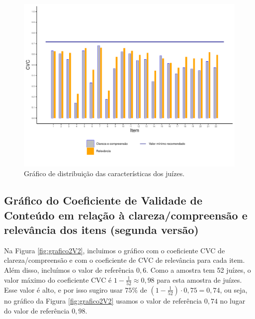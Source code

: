 \documentclass[
]{article}
\begin{document}
\begin{figure}[htbp]

{\centering \includegraphics[width=0.9\linewidth]{../figures/grafico2_0_8} 

}

\caption{Gráfico de distribuição das características dos juízes.}\label{fig:grafico2V1}
\end{figure}

\newpage

\hypertarget{gruxe1fico-do-coeficiente-de-validade-de-conteuxfado-em-relauxe7uxe3o-uxe0-clarezacompreensuxe3o-e-relevuxe2ncia-dos-itens-segunda-versuxe3o}{%
\subsection{Gráfico do Coeficiente de Validade de Conteúdo em relação à clareza/compreensão e relevância dos itens (segunda versão)}\label{gruxe1fico-do-coeficiente-de-validade-de-conteuxfado-em-relauxe7uxe3o-uxe0-clarezacompreensuxe3o-e-relevuxe2ncia-dos-itens-segunda-versuxe3o}}

Na Figura \ref{fig:grafico2V2}, incluimos o gráfico com o coeficiente CVC de clareza/compreensão e com o coeficiente de CVC de relevância para cada item. Além disso, incluímos o valor de referência \(0,6\). Como a amostra tem 52 juízes, o valor máximo do coeficiente CVC é \(1-\frac{1}{52}\approx 0,98\) para esta amostra de juízes. Esse valor é alto, e por isso sugiro usar \(75\%\) de \(\left(1 - \frac{1}{52}\right) \cdot 0,75 = 0,74\), ou seja, no gráfico da Figura \ref{fig:grafico2V2} usamos o valor de referência \(0,74\) no lugar do valor de referência \(0,98\).
\end{document}
